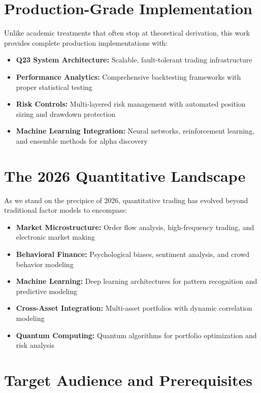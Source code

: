 \documentclass[11pt,letterpaper,openany]{book}
\begin{document}
\section*{Production-Grade Implementation}

Unlike academic treatments that often stop at theoretical derivation, this work provides complete production implementations with:

\begin{itemize}
    \item \textbf{Q23 System Architecture:} Scalable, fault-tolerant trading infrastructure
    \item \textbf{Performance Analytics:} Comprehensive backtesting frameworks with proper statistical testing
    \item \textbf{Risk Controls:} Multi-layered risk management with automated position sizing and drawdown protection
    \item \textbf{Machine Learning Integration:} Neural networks, reinforcement learning, and ensemble methods for alpha discovery
\end{itemize}

\section*{The 2026 Quantitative Landscape}

As we stand on the precipice of 2026, quantitative trading has evolved beyond traditional factor models to encompass:

\begin{itemize}
    \item \textbf{Market Microstructure:} Order flow analysis, high-frequency trading, and electronic market making
    \item \textbf{Behavioral Finance:} Psychological biases, sentiment analysis, and crowd behavior modeling
    \item \textbf{Machine Learning:} Deep learning architectures for pattern recognition and predictive modeling
    \item \textbf{Cross-Asset Integration:} Multi-asset portfolios with dynamic correlation modeling
    \item \textbf{Quantum Computing:} Quantum algorithms for portfolio optimization and risk analysis
\end{itemize}

\section*{Target Audience and Prerequisites}
\end{document}
